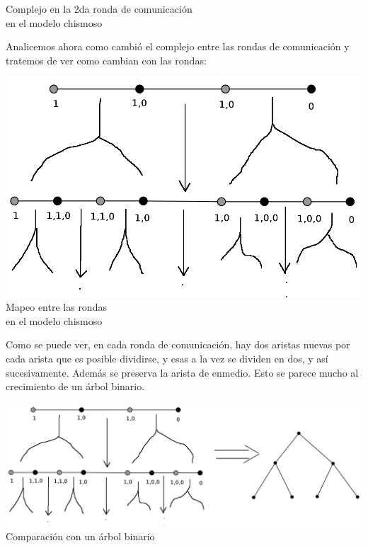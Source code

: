 \documentclass{article}
\begin{document}
\begin{enumerate}
{\begin{enumerate}
\begin{enumerate}
\begin{center}
        \scriptsize{Complejo en la 2da ronda de comunicación\\en el modelo chismoso}\\
        \end{center}
        Analicemos ahora como cambió el complejo entre las rondas de comunicación y tratemos
        de ver como cambian con las rondas:
        \begin{center}
        \includegraphics[scale=0.2]{cambiosrondas1a.png}\\
        \scriptsize{Mapeo entre las rondas\\en el modelo chismoso}\\
        \end{center}
        Como se puede ver, en cada ronda de comunicación, hay dos aristas nuevas por cada
        arista que es posible dividirse, y esas a la vez se dividen en dos, y así sucesivamente.
        Además se preserva la arista de enmedio. Esto se parece mucho al crecimiento de un árbol
        binario.
        \begin{center}
        \includegraphics[scale=0.2]{cambioschismosoarbol1a.png}\\
        \scriptsize{Comparación con un árbol binario}\\
        \end{center}

\end{enumerate}
\end{enumerate}}
\end{enumerate}
\end{document}
